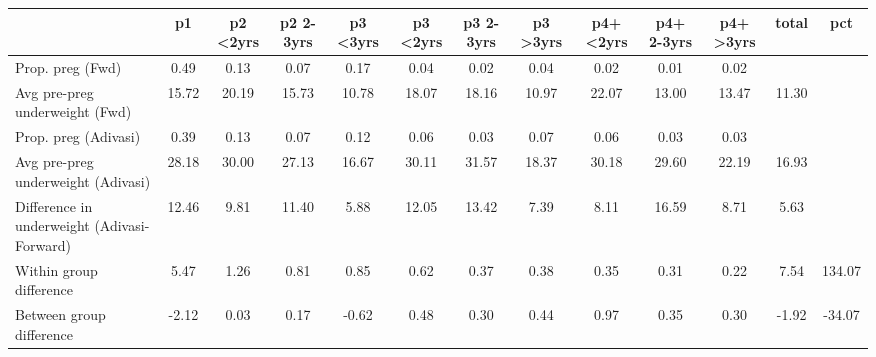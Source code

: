 \begin{tabular}{l*{12}{c}}
\toprule
            &\multicolumn{1}{c}{p1}&\multicolumn{1}{c}{p2 \textless2yrs}&\multicolumn{1}{c}{p2 2-3yrs}&\multicolumn{1}{c}{p3 \textless3yrs}&\multicolumn{1}{c}{p3 <2yrs}&\multicolumn{1}{c}{p3 2-3yrs}&\multicolumn{1}{c}{p3 >3yrs}&\multicolumn{1}{c}{p4+ <2yrs}&\multicolumn{1}{c}{p4+ 2-3yrs}&\multicolumn{1}{c}{p4+ >3yrs}&\multicolumn{1}{c}{total}&\multicolumn{1}{c}{pct}\\
\midrule
\midrule
Prop. preg (Fwd)&        0.49&        0.13&        0.07&        0.17&        0.04&        0.02&        0.04&        0.02&        0.01&        0.02&            &            \\
Avg pre-preg underweight (Fwd)&       15.72&       20.19&       15.73&       10.78&       18.07&       18.16&       10.97&       22.07&       13.00&       13.47&       11.30&            \\
Prop. preg (Adivasi)&        0.39&        0.13&        0.07&        0.12&        0.06&        0.03&        0.07&        0.06&        0.03&        0.03&            &            \\
Avg pre-preg underweight (Adivasi)&       28.18&       30.00&       27.13&       16.67&       30.11&       31.57&       18.37&       30.18&       29.60&       22.19&       16.93&            \\
Difference in underweight (Adivasi-Forward)&       12.46&        9.81&       11.40&        5.88&       12.05&       13.42&        7.39&        8.11&       16.59&        8.71&        5.63&            \\
Within group difference&        5.47&        1.26&        0.81&        0.85&        0.62&        0.37&        0.38&        0.35&        0.31&        0.22&        7.54&      134.07\\
Between group difference&       -2.12&        0.03&        0.17&       -0.62&        0.48&        0.30&        0.44&        0.97&        0.35&        0.30&       -1.92&      -34.07\\
\bottomrule
\end{tabular}

